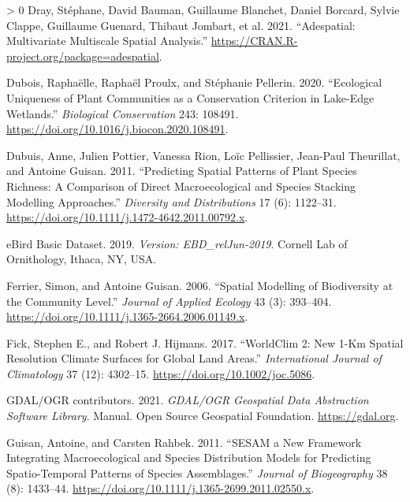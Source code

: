 \documentclass[10pt,oneside]{article}
\newlength{\cslhangindent}
\newenvironment{CSLReferences}[3] %
 {%
  \setlength{\parindent}{0pt}
  \ifodd #1 \everypar{\setlength{\hangindent}{\cslhangindent}}\ignorespaces\fi
  \ifnum #2 > 0
  \setlength{\parskip}{#2\baselineskip}
  \fi
 }%
 {}
\begin{document}
\begin{CSLReferences}{1}{0}
\leavevmode\hypertarget{ref-Dray2021AdeMul}{}%
Dray, Stéphane, David Bauman, Guillaume Blanchet, Daniel Borcard, Sylvie
Clappe, Guillaume Guenard, Thibaut Jombart, et al. 2021. {``Adespatial:
Multivariate Multiscale Spatial Analysis.''}
\url{https://CRAN.R-project.org/package=adespatial}.

\leavevmode\hypertarget{ref-Dubois2020EcoUni}{}%
Dubois, Raphaëlle, Raphaël Proulx, and Stéphanie Pellerin. 2020.
{``Ecological Uniqueness of Plant Communities as a Conservation
Criterion in Lake-Edge Wetlands.''} \emph{Biological Conservation} 243:
108491. \url{https://doi.org/10.1016/j.biocon.2020.108491}.

\leavevmode\hypertarget{ref-Dubuis2011PreSpa}{}%
Dubuis, Anne, Julien Pottier, Vanessa Rion, Loïc Pellissier, Jean-Paul
Theurillat, and Antoine Guisan. 2011. {``Predicting Spatial Patterns of
Plant Species Richness: A Comparison of Direct Macroecological and
Species Stacking Modelling Approaches.''} \emph{Diversity and
Distributions} 17 (6): 1122--31.
\url{https://doi.org/10.1111/j.1472-4642.2011.00792.x}.

\leavevmode\hypertarget{ref-eBirdBasicDataset2019VerEbd}{}%
eBird Basic Dataset. 2019. \emph{Version: EBD\_relJun-2019}. Cornell Lab
of Ornithology, Ithaca, NY, USA.

\leavevmode\hypertarget{ref-Ferrier2006SpaMod}{}%
Ferrier, Simon, and Antoine Guisan. 2006. {``Spatial Modelling of
Biodiversity at the Community Level.''} \emph{Journal of Applied
Ecology} 43 (3): 393--404.
\url{https://doi.org/10.1111/j.1365-2664.2006.01149.x}.

\leavevmode\hypertarget{ref-Fick2017Wor2N}{}%
Fick, Stephen E., and Robert J. Hijmans. 2017. {``WorldClim 2: New 1-Km
Spatial Resolution Climate Surfaces for Global Land Areas.''}
\emph{International Journal of Climatology} 37 (12): 4302--15.
\url{https://doi.org/10.1002/joc.5086}.

\leavevmode\hypertarget{ref-GDALux2fOGRcontributors2021GdaOgr}{}%
GDAL/OGR contributors. 2021. \emph{GDAL/OGR Geospatial Data Abstraction
Software Library}. Manual. Open Source Geospatial Foundation.
\url{https://gdal.org}.

\leavevmode\hypertarget{ref-Guisan2011SesNew}{}%
Guisan, Antoine, and Carsten Rahbek. 2011. {``SESAM a New Framework
Integrating Macroecological and Species Distribution Models for
Predicting Spatio-Temporal Patterns of Species Assemblages.''}
\emph{Journal of Biogeography} 38 (8): 1433--44.
\url{https://doi.org/10.1111/j.1365-2699.2011.02550.x}.


\end{CSLReferences}
\end{document}
